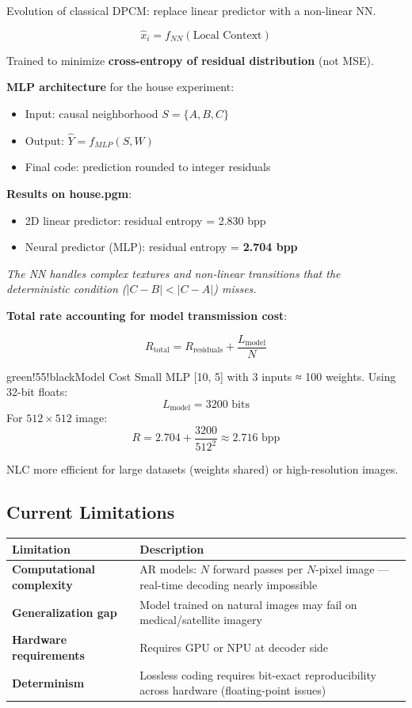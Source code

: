 Evolution of classical DPCM: replace linear predictor with a non-linear NN.

\[
\hat{x}_i = f_{NN}(\text{Local Context})
\]

Trained to minimize \textbf{cross-entropy of residual distribution} (not MSE).

\textbf{MLP architecture} for the house experiment:
\begin{itemize}
\item Input: causal neighborhood $S = \{A, B, C\}$
\item Output: $\hat{Y} = f_{MLP}(S, W)$
\item Final code: prediction rounded to integer residuals
\end{itemize}

\textbf{Results on house.pgm}:
\begin{itemize}
\item 2D linear predictor: residual entropy = 2.830 bpp
\item Neural predictor (MLP): residual entropy = \textbf{2.704 bpp}
\end{itemize}

\textit{The NN handles complex textures and non-linear transitions that the deterministic condition ($|C-B| < |C-A|$) misses.}

\textbf{Total rate accounting for model transmission cost}:

\[
R_{\text{total}} = R_{\text{residuals}} + \frac{L_{\text{model}}}{N}
\]

\begin{calloutbox}{green!55!black}{Model Cost}
Small MLP [10, 5] with 3 inputs ≈ 100 weights. Using 32-bit floats:
\[
L_{\text{model}} = 3200 \text{ bits}
\]
For $512 \times 512$ image:
\[
R = 2.704 + \frac{3200}{512^2} \approx 2.716 \text{ bpp}
\]

NLC more efficient for large datasets (weights shared) or high-resolution images.
\end{calloutbox}

\subsection{Current Limitations}

\begin{center}
\begin{tabular}{|l|l|}
\hline
\textbf{Limitation} & \textbf{Description} \\ \hline
\textbf{Computational complexity} & AR models: $N$ forward passes per $N$-pixel image — real-time decoding nearly impossible \\ \hline
\textbf{Generalization gap} & Model trained on natural images may fail on medical/satellite imagery \\ \hline
\textbf{Hardware requirements} & Requires GPU or NPU at decoder side \\ \hline
\textbf{Determinism} & Lossless coding requires bit-exact reproducibility across hardware (floating-point issues) \\ \hline
\end{tabular}
\end{center}

